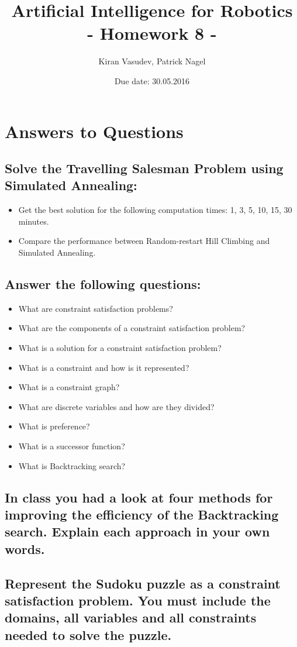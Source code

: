 \documentclass[11pt]{article}
\title{\textbf{Artificial Intelligence for Robotics\\ - Homework 8 -}}
\author{Kiran Vasudev, Patrick Nagel}
\date{Due date: 30.05.2016}
\begin{document}
\maketitle

\newpage
\tableofcontents

\newpage

\section{Answers to Questions}
	\subsection{Solve the Travelling Salesman Problem using Simulated Annealing:}
	\begin{itemize}
		\item{Get the best solution for the following computation times: 1, 3, 5, 10, 15, 30 minutes.}
		\item{Compare the performance between Random-restart Hill Climbing and Simulated Annealing.}
	\end{itemize}

\subsection{Answer the following questions:}
	\begin{itemize}
		\item{What are constraint satisfaction problems?}
		\item{What are the components of a constraint satisfaction problem?}
		\item{What is a solution for a constraint satisfaction problem?}
		\item{What is a constraint and how is it represented?}
		\item{What is a constraint graph?}
		\item{What are discrete variables and how are they divided?}
		\item{What is preference?}
		\item{What is a successor function?}
		\item{What is Backtracking search?}
	\end{itemize}
	
\subsection{In class you had a look at four methods for improving the efficiency of
the Backtracking search. Explain each approach in your own words.}

\subsection{Represent the Sudoku puzzle as a constraint satisfaction problem. You
must include the domains, all variables and all constraints needed to
solve the puzzle.}
\end{document}
